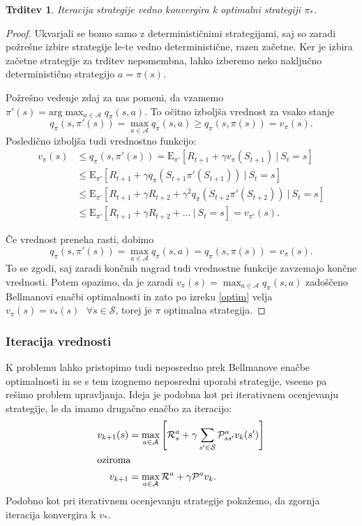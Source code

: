 \documentclass[12pt,a4paper]{amsart}
\theoremstyle{definition} %
\theoremstyle{plain} %
\newtheorem{trditev}[definicija]{Trditev}
\begin{document}
\begin{trditev}
    Iteracija strategije vedno konvergira k optimalni strategiji $\pi_*$.
\end{trditev}

\begin{proof}
    Ukvarjali se bomo samo z determinističnimi strategijami, saj so zaradi požrešne izbire 
    strategije le-te vedno deterministične, razen začetne. Ker je izbira začetne strategije za 
    trditev nepomembna, lahko izberemo neko naključno deterministično strategijo $a = \pi(s)$.

    Požrešno vedenje zdaj za nas pomeni, da vzamemo $\pi'(s) = 
    \text{arg}\max_{a \in \mathcal{A}} q_\pi(s, a)$. To očitno izboljša vrednost za vsako stanje 
    $$
    q_\pi(s, \pi'(s)) = \max_{a \in \mathcal{A}} q_\pi(s, a) \geq q_\pi(s, \pi(s)) = v_\pi(s).
    $$
    Posledično izboljša tudi vrednostno funkcijo: 
    \begin{align*}
        v_\pi(s) &\leq q_\pi(s, \pi'(s)) = \mathrm{E}_{\pi'} [R_{t+1} + 
            \gamma v_\pi(S_{t+1})~|~S_t = s] \\
        &\leq \mathrm{E}_{\pi'} [R_{t+1} + \gamma q_\pi(S_{t+1} \pi'(S_{t+1}))~|~S_t = s] \\
        &\leq \mathrm{E}_{\pi'} [R_{t+1} + \gamma R_{t+2} + 
            \gamma^2 q_\pi(S_{t+2} \pi'(S_{t+2}))~|~S_t = s] \\
        &\leq \mathrm{E}_{\pi'} [R_{t+1} + \gamma R_{t+2} + \dots~|~S_t = s] = v_{\pi'}(s).
    \end{align*}

Če vrednost preneha rasti, dobimo 
$$
q_\pi(s, \pi'(s)) = \max_{a \in \mathcal{A}} q_\pi(s, a) = q_\pi(s, \pi(s)) = v_\pi(s).
$$
To se zgodi, saj zaradi končnih nagrad tudi vrednostne funkcije zavzemajo končne vrednosti. 
Potem opazimo, da je zaradi $v_\pi(s) = \max_{a \in \mathcal{A}} q_\pi(s, a)$ zadoščeno Bellmanovi 
enačbi optimalnosti in zato po izreku \ref{optim} velja $v_\pi(s) = 
v_*(s) \text{ } \forall s \in \mathcal{S}$, torej je $\pi$ optimalna strategija.
\end{proof}

\subsubsection{Iteracija vrednosti}
K problemu lahko pristopimo tudi neposredno prek Bellmanove enačbe optimalnosti in se s tem 
izognemo neposredni uporabi strategije, vseeno pa rešimo problem upravljanja. Ideja je podobna kot 
pri iterativnem ocenjevanju strategije, le da imamo drugačno enačbo za iteracijo: 
\begin{align*}
    v_{k+1}(s) &= \max_{a \in \mathcal{A}} \left[ \mathcal{R}_s^a + 
        \gamma \sum_{s' \in \mathcal{S}} \mathcal{P}_{ss'}^a v_k(s') \right] \\
    \intertext{oziroma}
    v_{k+1} &= \max_{a \in \mathcal{A}} \mathcal{R}^a + \gamma \mathcal{P}^a v_k.
\end{align*}
Podobno kot pri iterativnem ocenjevanju strategije pokažemo, da zgornja iteracija konvergira k 
$v_*$.
\end{document}
